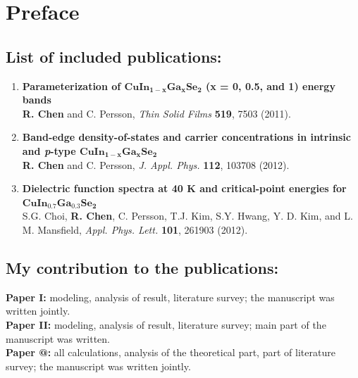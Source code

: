 \documentclass[a4paper, 12pt, titlepage,oneside,drop]{kthesis}
\makeatletter
\newcommand{\Rmnum}[1]{\expandafter\@slowromancap\romannumeral #1@}
\makeatother
\begin{document}
\newpage
\setcounter{page}{5}

\section*{Preface} 

\subsection*{List of included publications:}

\begin{enumerate}
\renewcommand{\labelenumi}{\Roman{enumi}}
\item{}  \textbf{Parameterization of $\mathbf {CuIn_{1-x}Ga_{x}Se_2}$ (x = 0, 0.5, and 1) energy bands}
\\\textbf{R. Chen} and C. Persson, \textit{Thin Solid Films} {\textbf {519}}, 7503 (2011).



\item{}\textbf{Band-edge density-of-states and carrier concentrations in intrinsic and \textit{p}-type $\mathbf {CuIn_{1-x}Ga_{x}Se_2}$}
\\\textbf{R. Chen} and C. Persson, \textit{J. Appl. Phys.} {\textbf {112}}, 103708 (2012).

\item{} \textbf{Dielectric function spectra at 40 K and critical-point energies for $\mathbf {CuIn_{0.7}Ga_{0.3}Se_2}$}
\\ S.G. Choi, \textbf{R. Chen}, C. Persson, T.J. Kim, S.Y. Hwang, Y. D. Kim, and L. M. Mansfield,
\textit{Appl. Phys. Lett. } {\textbf {101}}, 261903 (2012).

\end{enumerate}
\subsection*{My contribution to the publications:}

\textbf{Paper I:} modeling, analysis of result, literature survey;
the manuscript was written jointly.\\
\textbf{Paper II:} modeling, analysis of result, literature survey; main part of the manuscript was written.\\
\textbf{Paper \Rmnum{3}:} all calculations, analysis of the theoretical part, part of literature survey;
the manuscript was written jointly.\\
\end{document}
